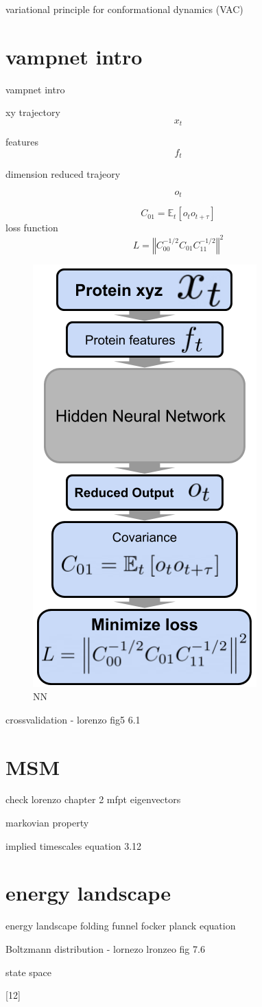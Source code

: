 variational principle for conformational dynamics (VAC)


\section{vampnet intro}
vampnet intro


xy trajectory
$$x_{t}$$

features
$$f_{t}$$

dimension reduced trajeory

$$o_{t}$$

$$C_{01}=\ensuremath{\mathbb{E}}_{t}\left[o_{t}o_{t+\tau}\right]$$
loss function
$$L=\left\Vert C_{00}^{-1/2}C_{01}C_{11}^{-1/2}\right\Vert ^{2}$$

\begin{figure}[h]
  \centering
  \includegraphics[width=0.4\linewidth]{figures3/NN.png}
  \caption{NN}
  \label{fig:NN}
\end{figure}


crossvalidation  - lorenzo fig5 6.1


\section{MSM}
check  lorenzo chapter 2
mfpt
eigenvectors

markovian property

implied timescales equation 3.12

\section{energy landscape }
energy landscape 
folding funnel
focker planck equation

Boltzmann distribution - lornezo
lronzeo fig 7.6

state space


[12]